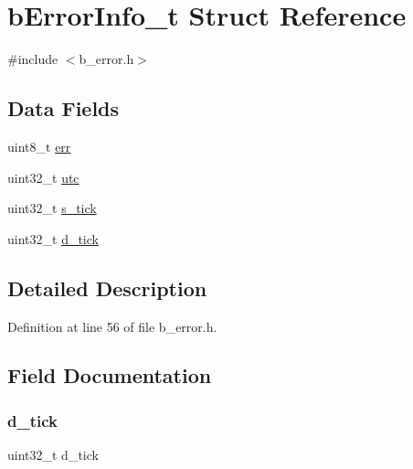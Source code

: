 \hypertarget{structb_error_info__t}{}\section{b\+Error\+Info\+\_\+t Struct Reference}
\label{structb_error_info__t}


{\ttfamily \#include $<$b\+\_\+error.\+h$>$}

\subsection*{Data Fields}
\begin{DoxyCompactItemize}
\item 
uint8\+\_\+t \mbox{\hyperlink{structb_error_info__t_a4028993b4bc2c4b88683e7cffeb01429}{err}}
\item 
uint32\+\_\+t \mbox{\hyperlink{structb_error_info__t_ac33a21166535be799d0d3743c23ad044}{utc}}
\item 
uint32\+\_\+t \mbox{\hyperlink{structb_error_info__t_a75e846b74ee697f342eb8f166cce8dcc}{s\+\_\+tick}}
\item 
uint32\+\_\+t \mbox{\hyperlink{structb_error_info__t_a3771740e80f407395e8d5948dbe4f357}{d\+\_\+tick}}
\end{DoxyCompactItemize}


\subsection{Detailed Description}


Definition at line 56 of file b\+\_\+error.\+h.



\subsection{Field Documentation}
\mbox{\label{structb_error_info__t_a3771740e80f407395e8d5948dbe4f357}} 
\subsubsection{\texorpdfstring{d\+\_\+tick}{d\_tick}}
{\footnotesize\ttfamily uint32\+\_\+t d\+\_\+tick}



